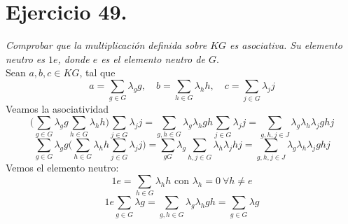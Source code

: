 \section{Ejercicio 49.}
\emph{Comprobar que la multiplicación definida sobre \(KG\) es asociativa. Su elemento neutro es \(1e\), donde \(e\) es el elemento neutro de \(G\)}.\\

Sean \(a,b,c \in KG\), tal que
\[
  a = \sum_{g \in G}\lambda_{g}g, \quad b = \sum_{h \in G}\lambda_{h}h, \quad c = \sum_{j \in G}\lambda_{j}j
\]
Veamos la asociatividad
\[
\Big(  \sum_{g \in G}\lambda_{g}g \sum_{h \in G}\lambda_{h}h  \Big)  \sum_{j \in G}\lambda_{j}j = \sum_{g,h \in G} \lambda_{g}\lambda_{h}gh \sum_{j \in G} \lambda_{j}j = \sum_{g,h,j \in J} \lambda_{g}\lambda_{h}\lambda_{j}ghj
\]
\[
  \sum_{g \in G}\lambda_{g}g \Big( \sum_{h \in G}\lambda_{h}h  \sum_{j \in G}\lambda_{j}j \Big) =
  \sum_{g G} \lambda_{g} \sum_{h,j \in G} \lambda_{h}\lambda_{j}hj =
  \sum_{g,h,j \in J} \lambda_{g}\lambda_{h}\lambda_{j}ghj
\]
Vemos el elemento neutro:
\[
  1e = \sum_{h \in G}\lambda_{h}h \text{ con } \lambda_{h} = 0 \ \forall h \neq e
\]
\[
  1e \sum_{g \in G}\lambda g = \sum_{g,h \in G}\lambda_{g}\lambda_{h} gh = \sum_{g \in G}\lambda g
\]
